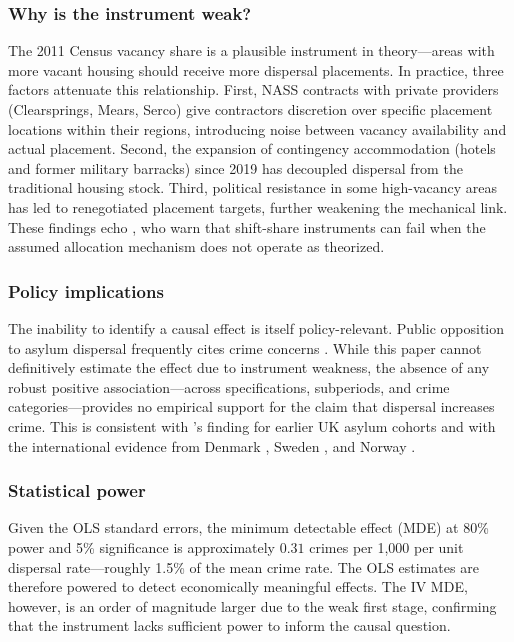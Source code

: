 \documentclass[12pt]{article}
\begin{document}
\subsubsection*{Why is the instrument weak?} The 2011 Census vacancy share is a plausible instrument in theory---areas with more vacant housing should receive more dispersal placements. In practice, three factors attenuate this relationship. First, NASS contracts with private providers (Clearsprings, Mears, Serco) give contractors discretion over specific placement locations within their regions, introducing noise between vacancy availability and actual placement. Second, the expansion of contingency accommodation (hotels and former military barracks) since 2019 has decoupled dispersal from the traditional housing stock. Third, political resistance in some high-vacancy areas has led to renegotiated placement targets, further weakening the mechanical link. These findings echo \citet{jaeger2020shift}, who warn that shift-share instruments can fail when the assumed allocation mechanism does not operate as theorized.

\subsubsection*{Policy implications} The inability to identify a causal effect is itself policy-relevant. Public opposition to asylum dispersal frequently cites crime concerns \citep{wadsworth2010uk}. While this paper cannot definitively estimate the effect due to instrument weakness, the absence of any robust positive association---across specifications, subperiods, and crime categories---provides no empirical support for the claim that dispersal increases crime. This is consistent with \citet{bell2013crime}'s finding for earlier UK asylum cohorts and with the international evidence from Denmark \citep{damm2009determinants}, Sweden \citep{edin2003effect, aslund2005now}, and Norway \citep{dahl2018refugees}.

\subsubsection*{Statistical power} Given the OLS standard errors, the minimum detectable effect (MDE) at 80\% power and 5\% significance is approximately $0.31$ crimes per 1,000 per unit dispersal rate---roughly 1.5\% of the mean crime rate. The OLS estimates are therefore powered to detect economically meaningful effects. The IV MDE, however, is an order of magnitude larger due to the weak first stage, confirming that the instrument lacks sufficient power to inform the causal question.
\end{document}
